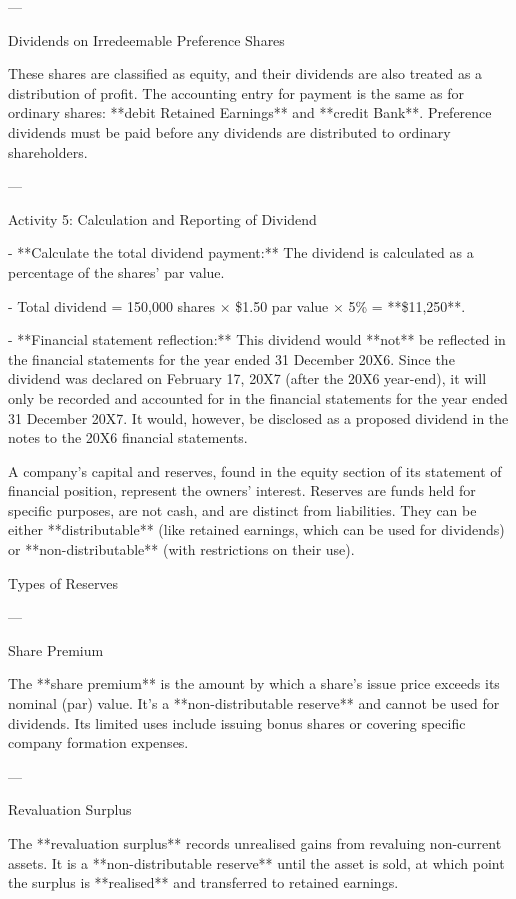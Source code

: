 ---

 Dividends on Irredeemable Preference Shares

These shares are classified as equity, and their dividends are also treated as a distribution of profit. The accounting entry for payment is the same as for ordinary shares: **debit Retained Earnings** and **credit Bank**. Preference dividends must be paid before any dividends are distributed to ordinary shareholders.

---

 Activity 5: Calculation and Reporting of Dividend

- **Calculate the total dividend payment:** The dividend is calculated as a percentage of the shares' par value.
    
    - Total dividend = 150,000 shares × \$1.50 par value × 5\% = **\$11,250**.
        
- **Financial statement reflection:** This dividend would **not** be reflected in the financial statements for the year ended 31 December 20X6. Since the dividend was declared on February 17, 20X7 (after the 20X6 year-end), it will only be recorded and accounted for in the financial statements for the year ended 31 December 20X7. It would, however, be disclosed as a proposed dividend in the notes to the 20X6 financial statements.



A company's capital and reserves, found in the equity section of its statement of financial position, represent the owners' interest. Reserves are funds held for specific purposes, are not cash, and are distinct from liabilities. They can be either **distributable** (like retained earnings, which can be used for dividends) or **non-distributable** (with restrictions on their use).

 Types of Reserves

---

 Share Premium

The **share premium** is the amount by which a share's issue price exceeds its nominal (par) value. It's a **non-distributable reserve** and cannot be used for dividends. Its limited uses include issuing bonus shares or covering specific company formation expenses.

---

Revaluation Surplus

The **revaluation surplus** records unrealised gains from revaluing non-current assets. It is a **non-distributable reserve** until the asset is sold, at which point the surplus is **realised** and transferred to retained earnings.

